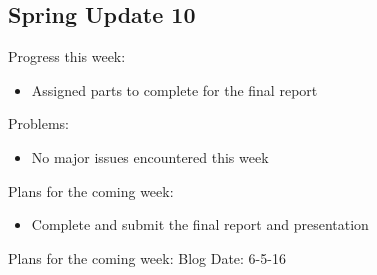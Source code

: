 \subsection{Spring Update 10}
Progress this week:
\begin{itemize}
   \item Assigned parts to complete for the final report
\end{itemize}
Problems:
\begin{itemize}
   \item No major issues encountered this week
\end{itemize}
Plans for the coming week:
\begin{itemize}
   \item Complete and submit the final report and presentation
\end{itemize}
Plans for the coming week:
Blog Date: 6-5-16
